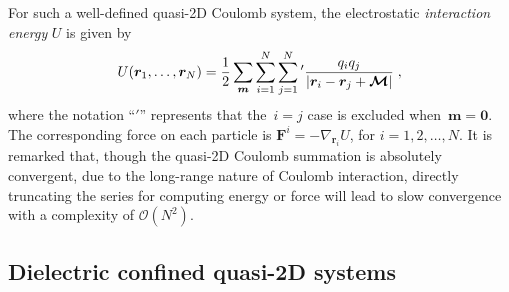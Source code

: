 For such a well-defined quasi-2D Coulomb system, the electrostatic \emph{interaction energy} $U$ is given by
\begin{equation} \label{eq::U_pair}
	U(\bm{r}_1, \ldots,\bm{r}_N)= \frac{1}{2} \sum_{\boldsymbol{m}} \sum_{i=1}^{N} \sum_{j=1}^N {}^\prime \frac{q_i q_j} {|\bm{r}_{i}-\bm{r}_{j} + \bm{\mathcal{M}}|}\;,
\end{equation}
where the notation ``$\prime$'' represents that the~$i = j$ case is excluded when~$\bm{m} = \bm{0}$.
The corresponding force on each particle is $\bm{F}^i=-\nabla_{\bm{r}_{i}} U$, for $i=1,2,\ldots, N$.
It is remarked that, though the quasi-2D Coulomb summation is absolutely convergent, due to the long-range nature of Coulomb interaction, directly truncating the series for computing energy or force will lead to slow convergence with a complexity of $\mathcal O(N^2)$.


\subsection{Dielectric confined quasi-2D systems}

